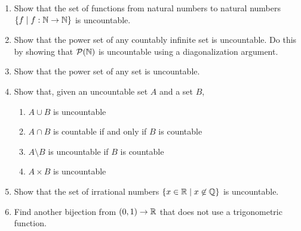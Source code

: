 \documentclass[main.tex]{subfiles}
\begin{document}
\begin{enumerate}
	\item Show that the set of functions from natural numbers to natural numbers \(\{ f \mid f : \mathbb{N} \rightarrow \mathbb{N} \}\) is uncountable.
	\item
	Show that the power set of any countably infinite set is uncountable.
	Do this by showing that \(\mathcal{P}(\mathbb{N})\) is uncountable using a diagonalization argument.
	\item Show that the power set of any set is uncountable.
	\item Show that, given an uncountable set \(A\) and a set \(B\),
	\begin{enumerate}
		\item \(A \cup B\) is uncountable
		\item \(A \cap B\) is countable if and only if \(B\) is countable
		\item \(A \setminus B\) is uncountable if \(B\) is countable
		\item \(A \times B\) is uncountable
	\end{enumerate}
	\item Show that the set of irrational numbers \(\{ x \in \mathbb{R} \mid x \not\in \mathbb{Q} \}\) is uncountable.
	\item Find another bijection from \((0,1) \rightarrow \mathbb{R}\) that does not use a trigonometric function.
\end{enumerate}
\end{document}
